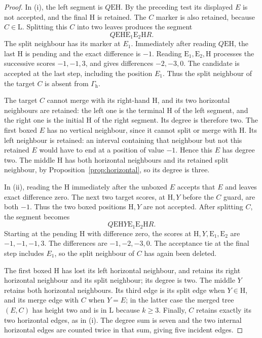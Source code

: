 \documentclass[11pt,a4paper]{article}
\theoremstyle{definition}
\theoremstyle{remark}
\newcommand{\E}{\mathrm E}
\newcommand{\HH}{\mathrm H}
\newcommand{\LL}{\mathrm L}
\newcommand{\Gh}{\Gamma_{\mathrm h}}
\begin{document}
\begin{proof}
In (i), the left segment is $Q\E\HH$. By the preceding test its displayed $E$ is not accepted, and the final $\HH$ is retained. The $C$ marker is also retained, because $C\in\LL$. Splitting this $C$ into two leaves produces the segment
\[
Q\E\HH\E_1\E_2\HH R.
\]
The split neighbour has its marker at $E_1$. Immediately after reading $Q\E\HH$, the last $\HH$ is pending and the exact difference is $-1$. Reading $\E_1,\E_2,\HH$ processes the successive scores $-1,-1,3$, and gives differences $-2,-3,0$. The candidate is accepted at the last step, including the position $E_1$. Thus the split neighbour of the target $C$ is absent from $\Gh$.

The target $C$ cannot merge with its right-hand $\HH$, and its two horizontal neighbours are retained: the left one is the terminal $\HH$ of the left segment, and the right one is the initial $\HH$ of the right segment. Its degree is therefore two. The first boxed $E$ has no vertical neighbour, since it cannot split or merge with $\HH$. Its left neighbour is retained: an interval containing that neighbour but not this retained $E$ would have to end at a position of value $-1$. Hence this $E$ has degree two. The middle $\HH$ has both horizontal neighbours and its retained split neighbour, by Proposition~\ref{prop:horizontal}, so its degree is three.

In (ii), reading the $\HH$ immediately after the unboxed $E$ accepts that $E$ and leaves exact difference zero. The next two target scores, at $\HH,Y$ before the $C$ guard, are both $-1$. Thus the two boxed positions $\HH,Y$ are not accepted. After splitting $C$, the segment becomes
\[
Q\E\HH Y\E_1\E_2\HH R.
\]
Starting at the pending $\HH$ with difference zero, the scores at $\HH,Y,\E_1,\E_2$ are $-1,-1,-1,3$. The differences are $-1,-2,-3,0$. The acceptance tie at the final step includes $E_1$, so the split neighbour of $C$ has again been deleted.

The first boxed $\HH$ has lost its left horizontal neighbour, and retains its right horizontal neighbour and its split neighbour; its degree is two. The middle $Y$ retains both horizontal neighbours. Its third edge is its split edge when $Y\in\HH$, and its merge edge with $C$ when $Y=E$; in the latter case the merged tree $(E,C)$ has height two and is in $\LL$ because $k\ge3$. Finally, $C$ retains exactly its two horizontal edges, as in (i). The degree sum is seven and the two internal horizontal edges are counted twice in that sum, giving five incident edges.
\end{proof}
\end{document}
